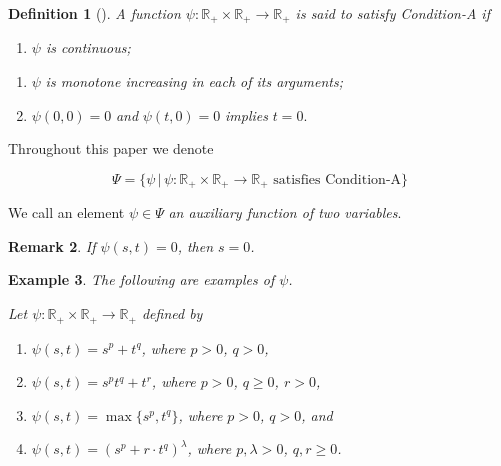 \documentclass[11]{article}
\newtheorem{definition}{Definition}[section]
\newtheorem{remark}[definition]{Remark}
\newtheorem{example}[definition]{Example}
\numberwithin{equation}{section}
\begin{document}
\begin{definition}[\cite{Choudhury2000}]
A function $\psi:\mathbb{R}_{+}\times \mathbb{R}_{+}\to \mathbb{R}_{+}$ is said to satisfy Condition-A if
\begin{enumerate}
    \item[(i)] $\psi$ is continuous;
\end{enumerate}
\end{definition}




\begin{enumerate}
    \item[(ii)] $\psi$ \textit{is monotone increasing in each of its arguments;}

    \item[(iii)] $\psi(0,0)=0$ \textit{and} $\psi(t,0)=0$ \textit{implies} $t=0$.
\end{enumerate}

Throughout this paper we denote

\[
\Psi=\{\psi\,|\,\psi:\mathbb{R}_{+}\times\mathbb{R}_{+}\to\mathbb{R}_{+} \text{ satisfies Condition-A}\}
\]

We call an element $\psi\in\Psi$ \textit{an auxiliary function of two variables}.

\begin{remark} \label{rem:1.3}
If $\psi(s,t)=0$, then $s=0$.
\end{remark}

\begin{example}
The following are examples of $\psi$.

Let $\psi:\mathbb{R}_{+}\times\mathbb{R}_{+}\to\mathbb{R}_{+}$ defined by

\begin{enumerate}
    \item[(i)] $\psi(s,t)=s^{p}+t^{q}$, where $p>0$, $q>0$,
    
    \item[(ii)] $\psi(s,t)=s^{p}t^{q}+t^{r}$, where $p>0$, $q\geq 0$, $r>0$,
    
    \item[(iii)] $\psi(s,t)=\max\{s^{p},t^{q}\}$, where $p>0$, $q>0$, and
    
    \item[(iv)] $\psi(s,t)=(s^{p}+r\cdot t^{q})^{\lambda}$, where $p,\lambda>0$, $q,r\geq 0$.
\end{enumerate}
\end{example}
\end{document}
